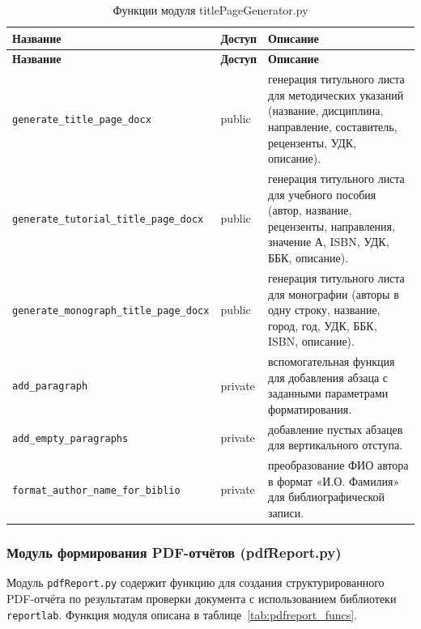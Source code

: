 \begin{xltabular}{\textwidth}{|p{7cm}|p{1.8cm}|X|}
	\caption{Функции модуля titlePageGenerator.py\label{tab:titlepage_funcs}}\\
	\hline
	\textbf{Название} & \textbf{Доступ} & \textbf{Описание} \\
	\hline
	\endfirsthead
	
	\hline
	\textbf{Название} & \textbf{Доступ} & \textbf{Описание} \\
	\hline
	\endhead
	
	\hline
	\endfoot
	
	\texttt{generate\_title\_page\_docx} & public & генерация титульного листа для методических указаний (название, дисциплина, направление, составитель, рецензенты, УДК, описание). \\ \hline
	\texttt{generate\_tutorial\_title\_page\_docx} & public & генерация титульного листа для учебного пособия (автор, название, рецензенты, направления, значение А, ISBN, УДК, ББК, описание). \\ \hline
	\texttt{generate\_monograph\_title\_page\_docx} & public & генерация титульного листа для монографии (авторы в одну строку, название, город, год, УДК, ББК, ISBN, описание). \\ \hline
	\texttt{add\_paragraph} & private & вспомогательная функция для добавления абзаца с заданными параметрами форматирования. \\ \hline
	\texttt{add\_empty\_paragraphs} & private & добавление пустых абзацев для вертикального отступа. \\ \hline
	\texttt{format\_author\_name\_for\_biblio} & private & преобразование ФИО автора в формат «И.О. Фамилия» для библиографической записи. \\ \hline
\end{xltabular}

\subsubsection{Модуль формирования PDF-отчётов (pdfReport.py)}

Модуль \texttt{pdfReport.py} содержит функцию для создания структурированного PDF-отчёта по результатам проверки документа с использованием библиотеки \texttt{reportlab}. Функция модуля описана в таблице~\ref{tab:pdfreport_funcs}.

